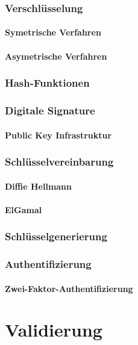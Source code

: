 \documentclass[10pt, a4paper]{scrreprt}
\begin{document}
\section{Verschlüsselung}
\subsection{Symetrische Verfahren}
\subsection{Asymetrische Verfahren}

\section{Hash-Funktionen}
\section{Digitale Signature}
\subsection{Public Key Infrastruktur}
\section{Schlüsselvereinbarung}
\subsection{Diffie Hellmann}
\subsection{ElGamal}
\section{Schlüsselgenerierung}
\section{Authentifizierung}
\subsection{Zwei-Faktor-Authentifizierung}


\part{Validierung}
\end{document}
